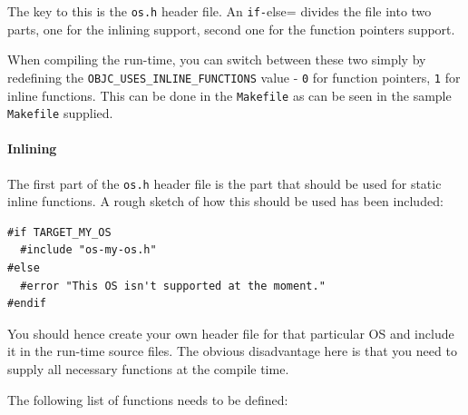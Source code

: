 The key to this is the \verb=os.h= header file. An \verb#if-#else= divides the file into two parts, one for the inlining support, second one for the function pointers support.

When compiling the run-time, you can switch between these two simply by redefining the \verb=OBJC_USES_INLINE_FUNCTIONS= value - \verb=0= for function pointers, \verb=1= for inline functions. This can be done in the \verb=Makefile= as can be seen in the sample \verb=Makefile= supplied.

\paragraph{Inlining}

The first part of the \verb=os.h= header file is the part that should be used for static inline functions. A rough sketch of how this should be used has been included:

\begin{verbatim}
#if TARGET_MY_OS
  #include "os-my-os.h"
#else
  #error "This OS isn't supported at the moment."
#endif
\end{verbatim}

You should hence create your own header file for that particular OS and include it in the run-time source files. The obvious disadvantage here is that you need to supply all necessary functions at the compile time.

The following list of functions needs to be defined:

